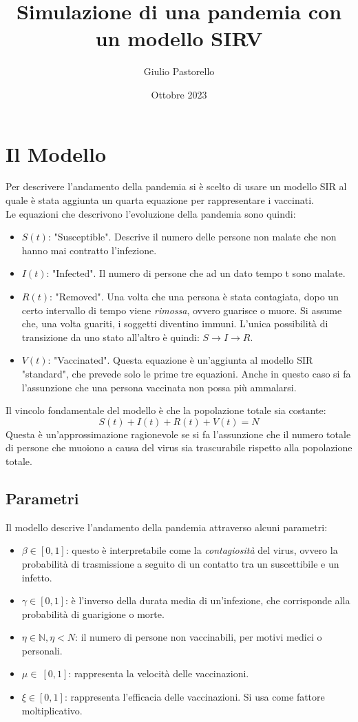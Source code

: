 \documentclass{article}
\title{Simulazione di una pandemia con un modello SIRV}
\author{Giulio Pastorello }
\date{Ottobre 2023}
\begin{document}
\maketitle

\section{Il Modello}

\hspace{\parindent} Per descrivere l'andamento della pandemia si è scelto 
di usare un modello SIR al quale è stata aggiunta un quarta 
equazione per rappresentare i vaccinati.\\
Le equazioni che descrivono l'evoluzione della pandemia sono quindi:
\begin{itemize}
\item $S(t)$: "Susceptible". Descrive il numero delle persone non 
malate che non hanno mai contratto l'infezione.
\item $I(t)$: "Infected". Il numero di persone che ad un dato tempo 
t sono malate. 
\item $R(t)$: "Removed". Una volta che una persona è stata 
contagiata, dopo un certo intervallo di tempo viene \textit{rimossa}, 
ovvero guarisce o muore. Si assume che, una volta guariti, 
i soggetti diventino immuni. L'unica possibilità di transizione da 
uno stato all'altro è quindi: $S\xrightarrow{}I\xrightarrow{}R$.
\item $V(t)$: "Vaccinated". Questa equazione è un'aggiunta al modello 
SIR "standard", che prevede solo le prime tre equazioni. 
Anche in questo caso si fa l'assunzione che una persona vaccinata 
non possa più ammalarsi.
\end{itemize}
Il vincolo fondamentale del modello è che la popolazione totale 
sia costante:
$$S(t)+I(t)+R(t)+V(t)=N$$
Questa è un'approssimazione ragionevole se si fa l'assunzione 
che il numero totale di persone che muoiono a causa del virus 
sia trascurabile rispetto alla popolazione totale.
\subsection{Parametri}
Il modello descrive l'andamento della pandemia attraverso alcuni 
parametri:
\begin{itemize} 
\item $\beta \in [0,1]$: questo è interpretabile come la 
\textit{contagiosità} del virus, ovvero la probabilità di 
trasmissione a seguito di un contatto tra un suscettibile e un infetto.
\item $\gamma \in [0,1]$: è l'inverso della durata media di 
un'infezione, che corrisponde alla probabilità di guarigione o morte.
\item $\eta \in \mathbb{N}, \eta < N$: il numero di persone non 
vaccinabili, per motivi medici o personali.
\item $\mu \in\ [0,1]$: rappresenta la velocità delle vaccinazioni.
\item $\xi \in [0,1]$: rappresenta l'efficacia delle vaccinazioni. 
Si usa come fattore moltiplicativo.
\end{itemize}
\end{document}
